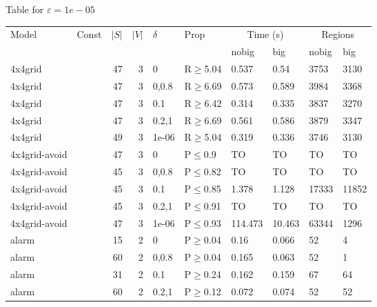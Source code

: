 \small Table for \(\varepsilon=1e-05\)
\begin{longtable}{llrrllllll}

        \toprule
        Model & Const & $|S|$ & $|V|$ & $\delta$ & Prop & \multicolumn{2}{c}{Time (s)} & \multicolumn{2}{c}{Regions} \\
        \cmidrule(ll){7-8} \cmidrule(ll){9-10}
        & & & & & & nobig & big & nobig & big \\
        \midrule
        
 4x4grid       &           &     	47 &    3 & 0     & R$\geq$5.04  & 0.537    & 0.54     & 3753    & 3130   \\
 4x4grid       &           &     	47 &    3 & 0,0.8 & R$\geq$6.69  & 0.573    & 0.589    & 3984    & 3368   \\
 4x4grid       &           &     	47 &    3 & 0.1   & R$\geq$6.42  & 0.314    & 0.335    & 3837    & 3270   \\
 4x4grid       &           &     	47 &    3 & 0.2,1 & R$\geq$6.69  & 0.561    & 0.586    & 3879    & 3347   \\
 4x4grid       &           &     	49 &    3 & 1e-06 & R$\geq$5.04  & 0.319    & 0.336    & 3746    & 3130   \\
 4x4grid-avoid &           &     	47 &    3 & 0     & P$\leq$0.9   & TO       & TO       & TO      & TO     \\
 4x4grid-avoid &           &     	45 &    3 & 0,0.8 & P$\leq$0.82  & TO       & TO       & TO      & TO     \\
 4x4grid-avoid &           &     	45 &    3 & 0.1   & P$\leq$0.85  & 1.378    & 1.128    & 17333   & 11852  \\
 4x4grid-avoid &           &     	45 &    3 & 0.2,1 & P$\leq$0.91  & TO       & TO       & TO      & TO     \\
 4x4grid-avoid &           &     	47 &    3 & 1e-06 & P$\leq$0.93  & 114.473  & 10.463   & 63344   & 1296   \\
 alarm         &           &     	15 &    2 & 0     & P$\geq$0.04  & 0.16     & 0.066    & 52      & 4      \\
 alarm         &           &     	60 &    2 & 0,0.8 & P$\geq$0.04  & 0.165    & 0.063    & 52      & 1      \\
 alarm         &           &     	31 &    2 & 0.1   & P$\geq$0.24  & 0.162    & 0.159    & 67      & 64     \\
 alarm         &           &     	60 &    2 & 0.2,1 & P$\geq$0.12  & 0.072    & 0.074    & 52      & 52     \\

\end{longtable}
